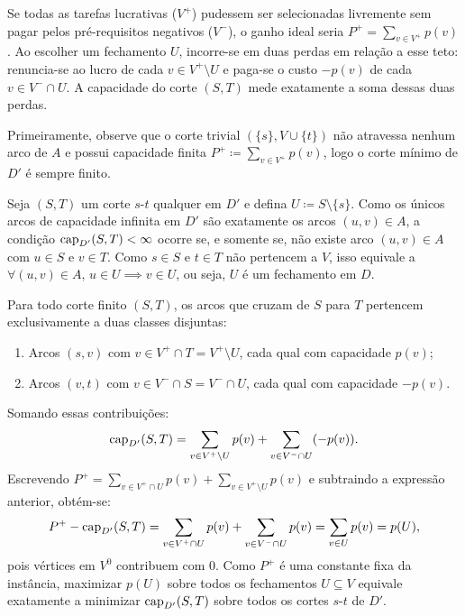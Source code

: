  Se todas as tarefas lucrativas ($V^+$) pudessem ser selecionadas livremente sem pagar pelos pré-requisitos negativos ($V^-$), o ganho ideal seria $P^+ = \sum_{v \in V^+} p(v)$. Ao escolher um fechamento $U$, incorre-se em duas perdas em relação a esse teto: renuncia-se ao lucro de cada $v \in V^+ \setminus U$ e paga-se o custo $-p(v)$ de cada $v \in V^- \cap U$. A capacidade do corte $(S, T)$ mede exatamente a soma dessas duas perdas.

\begin{demonstracao}
Primeiramente, observe que o corte trivial $(\{s\}, V \cup \{t\})$ não atravessa nenhum arco de $A$ e possui capacidade finita $P^+ \coloneqq \sum_{v \in V^+} p(v)$, logo o corte mínimo de $D'$ é sempre finito.

Seja $(S, T)$ um corte $s$-$t$ qualquer em $D'$ e defina $U \coloneqq S \setminus \{s\}$. Como os únicos arcos de capacidade infinita em $D'$ são exatamente os arcos $(u, v) \in A$, a condição $\operatorname{cap}_{D'}(S, T) < \infty$ ocorre se, e somente se, não existe arco $(u, v) \in A$ com $u \in S$ e $v \in T$. Como $s \in S$ e $t \in T$ não pertencem a $V$, isso equivale a $\forall (u, v) \in A,\, u \in U \implies v \in U$, ou seja, $U$ é um fechamento em $D$.

Para todo corte finito $(S, T)$, os arcos que cruzam de $S$ para $T$ pertencem exclusivamente a duas classes disjuntas:
\begin{enumerate}
    \item Arcos $(s, v)$ com $v \in V^+ \cap T = V^+ \setminus U$, cada qual com capacidade $p(v)$;
    \item Arcos $(v, t)$ com $v \in V^- \cap S = V^- \cap U$, cada qual com capacidade $-p(v)$.
\end{enumerate}
Somando essas contribuições:
\begin{equation*}
    \operatorname{cap}_{D'}(S, T) = \sum_{v \in V^+ \setminus U} p(v) + \sum_{v \in V^- \cap U} (-p(v)).
\end{equation*}
Escrevendo $P^+ = \sum_{v \in V^+ \cap U} p(v) + \sum_{v \in V^+ \setminus U} p(v)$ e subtraindo a expressão anterior, obtém-se:
\begin{equation*}
    P^+ - \operatorname{cap}_{D'}(S, T) = \sum_{v \in V^+ \cap U} p(v) + \sum_{v \in V^- \cap U} p(v) = \sum_{v \in U} p(v) = p(U),
\end{equation*}
pois vértices em $V^0$ contribuem com $0$. Como $P^+$ é uma constante fixa da instância, maximizar $p(U)$ sobre todos os fechamentos $U \subseteq V$ equivale exatamente a minimizar $\operatorname{cap}_{D'}(S, T)$ sobre todos os cortes $s$-$t$ de $D'$.
\end{demonstracao}

